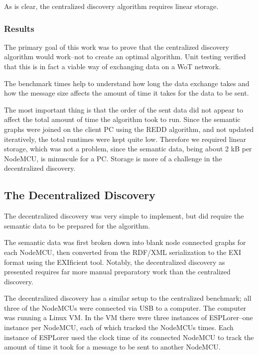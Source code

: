 

As is clear, the centralized discovery algorithm requires linear storage.

\subsubsection{Results}
The primary goal of this work was to prove that the centralized discovery algorithm would work--not to create an optimal algorithm. Unit testing verified that this is in fact a viable way of exchanging data on a WoT network.

The benchmark times help to understand how long the data exchange takes and how the message size affects the amount of time it takes for the data to be sent.

The most important thing is that the order of the sent data did not appear to affect the total amount of time the algorithm took to run. Since the semantic graphs were joined on the client PC using the REDD algorithm, and not updated iteratively, the total runtimes were kept quite low. Therefore we required linear storage, which was not a problem, since the semantic data, being about 2 kB per NodeMCU, is minuscule for a PC. Storage is more of a challenge in the decentralized discovery.

\subsection{The Decentralized Discovery}
The decentralized discovery was very simple to implement, but did require the semantic data to be prepared for the algorithm.

The semantic data was first broken down into blank node connected graphs for each NodeMCU, then converted from the RDF/XML serialization to the EXI format using the EXIficient tool. Notably, the decentralized discovery as presented requires far more manual preparatory work than the centralized discovery.


The decentralized discovery has a similar setup to the centralized benchmark; all three of the NodeMCUs were connected via USB to a computer. The computer was running a Linux VM. In the VM there were three instances of ESPLorer--one instance per NodeMCU, each of which tracked the NodeMCUs times. Each instance of ESPLorer used the clock time of its connected NodeMCU to track the amount of time it took for a message to be sent to another NodeMCU.

